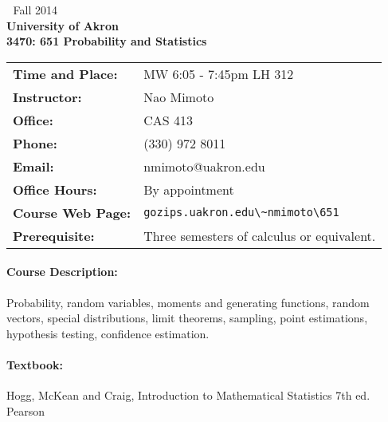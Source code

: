 


\thispagestyle{empty}


\begin{center}
  \textcolor{white}{ . } \vs-20mm
  {\Large{Fall 2014}}  \\ \bigskip
  {\Large{\bf University of Akron }}\\ \medskip
  {\Huge{\bf 3470: 651 Probability and Statistics }}\\\medskip
\end{center}



\begin{table}[!hb]
  \begin{center}
    \begin{tabular}{ll}
      \textbf{Time and Place: }& MW 6:05 - 7:45pm LH 312  \\
      \textbf{Instructor:     }& Nao Mimoto               \\
      \textbf{Office:         }& CAS 413                  \\
      \textbf{Phone:          }& (330) 972 8011           \\
      \textbf{Email:          }& nmimoto@uakron.edu       \\
      \textbf{Office Hours: }  & By appointment           \\
      \textbf{Course Web Page:}& \verb|gozips.uakron.edu\~nmimoto\651 |  \\
      \textbf{Prerequisite:}   & Three semesters of calculus or equivalent. \\
    \end{tabular}
  \end{center}
\end{table}


\paragraph{Course Description:}
Probability, random variables, moments and generating functions, 
random vectors, special distributions, limit theorems, sampling, 
point estimations, hypothesis testing, confidence estimation.


\paragraph{Textbook:}
Hogg, McKean and Craig,  
Introduction to Mathematical Statistics 7th ed. Pearson


